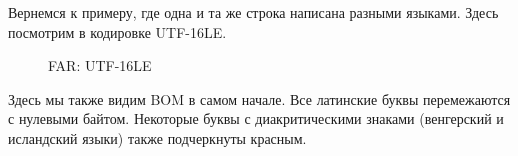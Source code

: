 Вернемся к примеру, где одна и та же строка написана разными языками.
Здесь посмотрим в кодировке UTF-16LE.

\begin{figure}[H]
\centering
{}
\caption{FAR: UTF-16LE}
\end{figure}

Здесь мы также видим \ac{BOM} в самом начале.
Все латинские буквы перемежаются с нулевыми байтом.
Некоторые буквы с диакритическими знаками (венгерский и исландский языки) также подчеркнуты красным.



